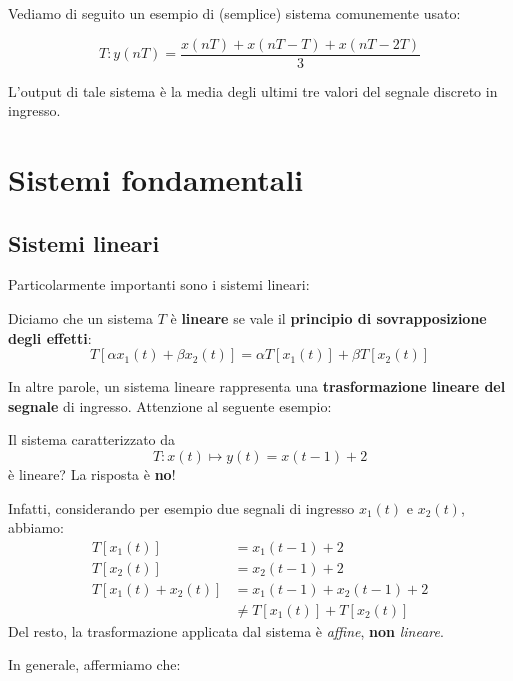 Vediamo di seguito un esempio di (semplice) sistema comunemente usato: 
\begin{exa}
    \[
        T: y(nT) = \frac{x(nT) + x(nT-T) + x(nT-2T)}{3}
    \] 
\end{exa}

L'output di tale sistema è la media degli ultimi tre valori del segnale discreto
in ingresso.


\section{Sistemi fondamentali}
\subsection{Sistemi lineari}

Particolarmente importanti sono i sistemi lineari:

\begin{definition}
    Diciamo che un sistema $T$ è \textbf{lineare} se vale
    il \textbf{principio di sovrapposizione degli effetti}:
    \[
        T[\alpha x_{1}(t) + \beta x_{2}(t)] = \alpha T[x_{1}(t)] + \beta T[x_{2}(t)]
    \] 
\end{definition}

In altre parole, un sistema lineare rappresenta una \textbf{trasformazione lineare del segnale}
di ingresso. Attenzione al seguente esempio:

\begin{exa}
    Il sistema caratterizzato da
    \[
        T: x(t) \mapsto y(t) = x(t-1) + 2
    \] 
    è lineare? La risposta è \textbf{no}!
\end{exa}

Infatti, considerando per esempio due segnali di ingresso $x_{1}(t)$ e $x_{2}(t)$,
abbiamo:
\[
    \begin{aligned}
        T[x_{1}(t)] &= x_{1}(t-1) + 2 \\
        T[x_{2}(t)] &= x_{2}(t-1) + 2 \\
        T[x_{1}(t) + x_{2}(t)] &= x_{1}(t-1) + x_{2}(t-1) + 2 \\ 
                               &\ne T[x_{1}(t)] + T[x_{2}(t)]
    \end{aligned}
\]
Del resto, la trasformazione applicata dal sistema è \textit{affine}, \textbf{non} \textit{lineare}.

In generale, affermiamo che:

